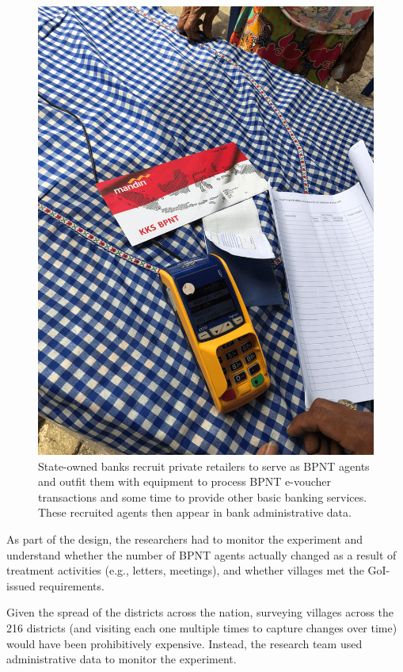 \documentclass[
]{WileySix}
\begin{document}
\begin{figure}
\includegraphics[width=1\linewidth]{./assets/indonesia/indonesiafigure2web} \caption{State-owned banks recruit private retailers to serve as BPNT agents and outfit them with equipment to process BPNT e-voucher transactions and some time to provide other basic banking services. These recruited agents then appear in bank administrative data.}\label{fig:indonesiafigure2}
\end{figure}

As part of the design, the researchers had to monitor the experiment and understand whether the number of BPNT agents actually changed as a result of treatment activities (e.g., letters, meetings), and whether villages met the GoI-issued requirements.

Given the spread of the districts across the nation, surveying villages across the 216 districts (and visiting each one multiple times to capture changes over time) would have been prohibitively expensive. Instead, the research team used administrative data to monitor the experiment.
\end{document}
